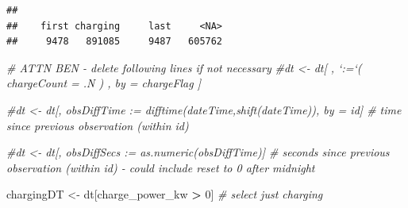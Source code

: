 \documentclass[]{article}
\newenvironment{Shaded}{\begin{snugshade}}{\end{snugshade}}
\newcommand{\DecValTok}[1]{\textcolor[rgb]{0.00,0.00,0.81}{#1}}
\newcommand{\StringTok}[1]{\textcolor[rgb]{0.31,0.60,0.02}{#1}}
\newcommand{\CommentTok}[1]{\textcolor[rgb]{0.56,0.35,0.01}{\textit{#1}}}
\newcommand{\OperatorTok}[1]{\textcolor[rgb]{0.81,0.36,0.00}{\textbf{#1}}}
\newcommand{\NormalTok}[1]{#1}
\begin{document}
\begin{verbatim}
## 
##    first charging     last     <NA> 
##     9478   891085     9487   605762
\end{verbatim}

\begin{Shaded}
\begin{Highlighting}[]
\CommentTok{# ATTN BEN - delete following lines if not necessary}
\CommentTok{#dt <- dt[ , `:=`( chargeCount = .N ) , by = chargeFlag ]}

\CommentTok{#dt <- dt[, obsDiffTime := difftime(dateTime,shift(dateTime)), by = id] # time since previous observation (within id)}

\CommentTok{#dt <- dt[, obsDiffSecs := as.numeric(obsDiffTime)] # seconds since previous observation (within id) - could include reset to 0 after midnight}
  
\NormalTok{chargingDT <-}\StringTok{ }\NormalTok{dt[charge_power_kw }\OperatorTok{>}\StringTok{ }\DecValTok{0}\NormalTok{] }\CommentTok{# select just charging}
\end{Highlighting}
\end{Shaded}

\begin{Shaded}
\end{Shaded}
\end{document}
